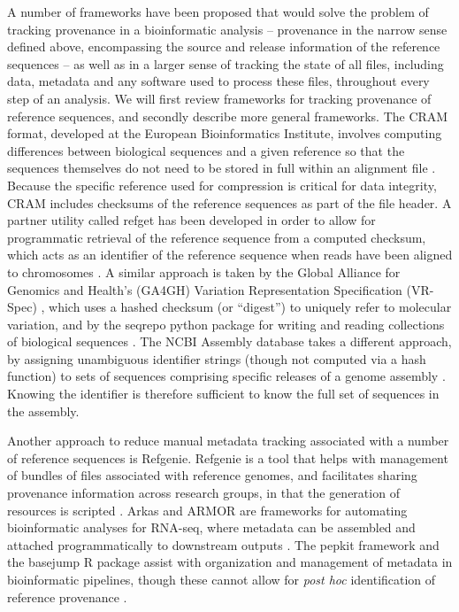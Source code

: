 \documentclass[10pt,letterpaper]{article}
\begin{document}
A number of frameworks have been proposed that would solve the problem
of tracking provenance in a bioinformatic analysis -- provenance in
the narrow sense defined above, encompassing the source and release
information of the reference sequences -- as well as in a larger sense
of tracking the state of all files, including data, metadata and
any software used to process these files, throughout every step of an
analysis. We will first review frameworks for tracking provenance of
reference sequences, and secondly describe more general
frameworks. The CRAM format, developed at the European Bioinformatics
Institute, involves computing differences between biological sequences
and a given reference so that the sequences themselves do not need to
be stored in full within an alignment file \cite{cram}. Because the
specific reference used for compression is critical for data
integrity, CRAM includes checksums of the reference sequences as part
of the file header. A partner utility called refget has been developed
in order to allow for programmatic retrieval of the reference sequence
from a computed checksum, which acts as an identifier of the reference
sequence
when reads have been aligned to chromosomes \cite{refget}.
A similar approach is taken by the Global
Alliance for Genomics and Health's (GA4GH) Variation Representation
Specification (VR-Spec) \cite{vr}, which uses a hashed checksum (or
``digest'') to uniquely refer to molecular variation, and by the
seqrepo python package for writing and reading collections of
biological sequences \cite{seqrepo}. The NCBI Assembly database takes
a different approach, by assigning unambiguous identifier strings
(though not computed via a hash function) to sets of sequences
comprising specific releases of a genome assembly
\cite{ncbi-assembly}. Knowing the identifier is therefore sufficient
to know the full set of sequences in the assembly.

Another approach to reduce manual metadata tracking associated with a
number of reference sequences is Refgenie. Refgenie is a tool that
helps with management of bundles of files associated with reference
genomes, and facilitates sharing provenance information across
research groups, in that the generation of resources is scripted
\cite{refgenie}. Arkas and ARMOR are 
frameworks for automating bioinformatic analyses for RNA-seq, where
metadata can be assembled and attached programmatically to downstream
outputs \cite{arkas,Orjuelag2019}. 
The pepkit framework and the basejump R package assist with
organization and management of metadata in bioinformatic pipelines,
though these cannot allow for \textit{post hoc} identification of
reference provenance \cite{pepkit, basejump}.
\end{document}
